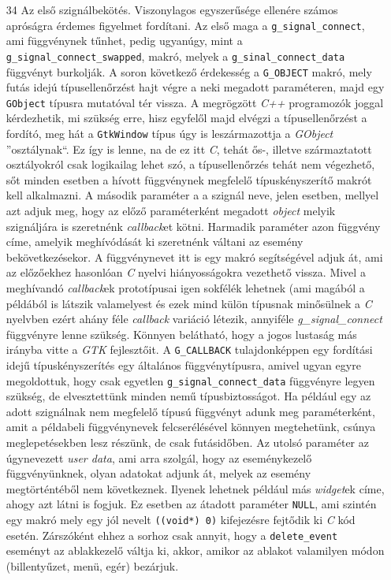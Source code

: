 \begin{enumerate}
 \item[34] Az első szignálbekötés. Viszonylagos egyszerűsége ellenére számos apróságra érdemes figyelmet fordítani. Az első maga a \texttt{g\_signal\_connect}, ami függvénynek tűnhet, pedig ugyanúgy, mint a \texttt{g\_signal\_connect\_swapped}, makró, melyek a \texttt{g\_sinal\_connect\_data} függvényt burkolják. A soron következő érdekesség a \texttt{G\_OBJECT} makró, mely futás idejú típusellenőrzést hajt végre a neki megadott paraméteren, majd egy \texttt{GObject} típusra mutatóval tér vissza. A megrögzött \textit{C++} programozók joggal kérdezhetik, mi szükség erre, hisz egyfelől majd elvégzi a típusellenőrzést a fordító, meg hát a \texttt{GtkWindow} típus úgy is leszármazottja a \textit{GObject} ''osztálynak``. Ez így is lenne, na de ez itt \textit{C}, tehát ős-, illetve származtatott osztályokról csak logikailag lehet szó, a típusellenőrzés tehát nem végezhető, sőt minden esetben a hívott függvénynek megfelelő típuskényszerítő makrót kell alkalmazni. A második paraméter a a szignál neve, jelen esetben, mellyel azt adjuk meg, hogy az előző paraméterként megadott \textit{object} melyik szignáljára is szeretnénk \textit{callback}et kötni. Harmadik paraméter azon függvény címe, amelyik meghívódását ki szeretnénk váltani az esemény bekövetkezésekor. A függvénynevet itt is egy makró segítségével adjuk át, ami az előzőekhez hasonlóan \textit{C} nyelvi hiányosságokra vezethető vissza. Mivel a meghívandó \textit{callback}ek prototípusai igen sokfélék lehetnek (ami magából a példából is látszik valamelyest és ezek mind külön típusnak minősülnek a \textit{C} nyelvben ezért ahány féle \textit{callback} variáció létezik, annyiféle \textit{g\_signal\_connect} függvényre lenne szükség. Könnyen belátható, hogy a jogos lustaság más irányba vitte a \textit{GTK} fejlesztőit. A \texttt{G\_CALLBACK} tulajdonképpen egy fordítási idejű típuskényszerítés egy általános függvénytípusra, amivel ugyan egyre megoldottuk, hogy csak egyetlen \texttt{g\_signal\_connect\_data} függvényre legyen szükség, de elvesztettünk minden nemű típusbiztosságot. Ha például egy az adott szignálnak nem megfelelő típusú függvényt adunk meg paraméterként, amit a példabeli függvénynevek felcserélésével könnyen megtehetünk, csúnya meglepetésekben lesz részünk, de csak futásidőben. Az utolsó paraméter az úgynevezett \textit{user data}, ami arra szolgál, hogy az eseménykezelő függvényünknek, olyan adatokat adjunk át, melyek az esemény megtörténtéből nem következnek. Ilyenek lehetnek például más \textit{widget}ek címe, ahogy azt látni is fogjuk. Ez esetben az átadott paraméter \texttt{NULL}, ami szintén egy makró mely egy jól nevelt \texttt{((void*) 0)} kifejezésre fejtődik ki \textit{C} kód esetén. Zárszóként ehhez a sorhoz csak annyit, hogy a \texttt{delete\_event} eseményt az ablakkezelő váltja ki, akkor, amikor az ablakot valamilyen módon (billentyűzet, menü, egér) bezárjuk.


\end{enumerate}
